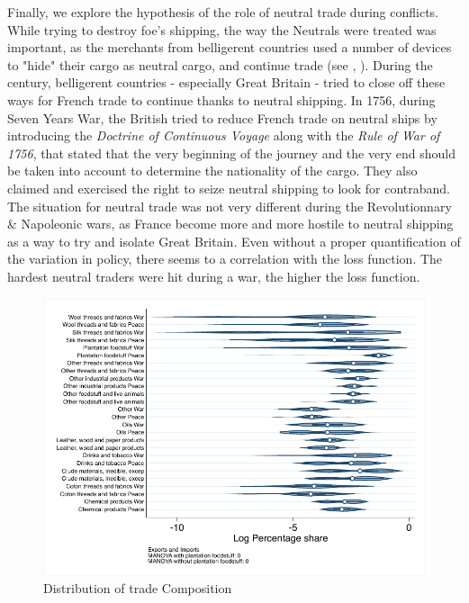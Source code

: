 \documentclass[12pt,a4paper,notitlepage]{article}
\begin{document}
Finally, we explore the hypothesis of the role of neutral trade during conflicts. 
While trying to destroy foe's shipping, the way the Neutrals were treated was important, as the merchants from belligerent countries used a number of devices to "hide" their cargo as neutral cargo, and continue trade (see \citep{carriere1973negociants}, \cite{schnakenbourg2013guerre}). 
During the century, belligerent countries - especially Great Britain - tried to close off these ways for French trade to continue thanks to neutral shipping.
In 1756, during Seven Years War, the British tried to reduce French trade on neutral ships by introducing the \textit{Doctrine of Continuous Voyage} along with the \textit{Rule of War of 1756}, that stated that the very beginning of the journey and the very end should be taken into account to determine the nationality of the cargo.
They also claimed and exercised the right to seize neutral shipping to look for contraband.
The situation for neutral trade was not very different during the Revolutionnary \& Napoleonic wars, as France become more and more hostile to neutral shipping as a way to try and isolate Great Britain. Even without a proper quantification of the variation in policy, there seems to a correlation with the loss function. The hardest neutral traders were hit during a war, the higher the loss function. 
\begin{figure}
\includegraphics[scale=.7]{peace_war_national_distribution_XI.pdf}
\caption{Distribution of trade Composition}
\label{peace_war_national_distribution_XI}
\end{figure}
\end{document}
